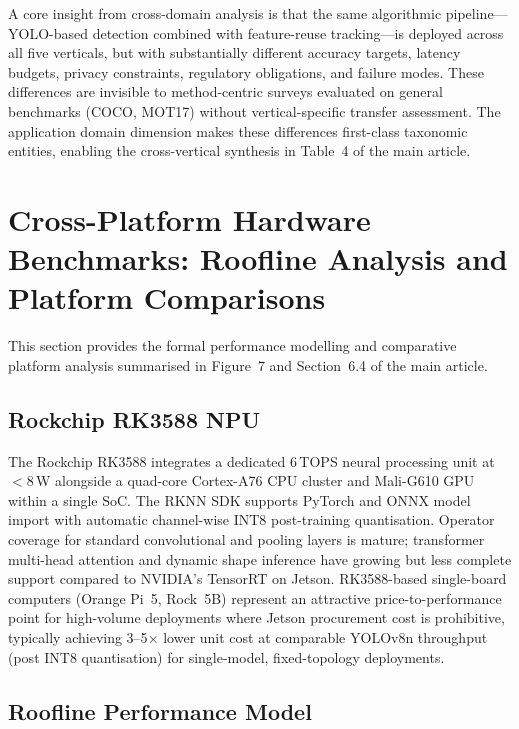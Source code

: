 \documentclass[11pt,a4paper]{article}
\begin{document}
A core insight from cross-domain analysis is that the same
algorithmic pipeline---YOLO-based detection combined with feature-reuse
tracking---is deployed across all five verticals, but with
substantially different accuracy targets, latency budgets, privacy
constraints, regulatory obligations, and failure modes. These
differences are invisible to method-centric surveys evaluated on
general benchmarks (COCO, MOT17) without vertical-specific transfer
assessment. The application domain dimension makes these
differences first-class taxonomic entities, enabling the cross-vertical
synthesis in Table~4 of the main article.

\section{Cross-Platform Hardware Benchmarks: Roofline Analysis
         and Platform Comparisons}
\label{sec:crossplatform}

\noindent This section provides the formal performance modelling and
comparative platform analysis summarised in Figure~7 and Section~6.4
of the main article.

\subsection{Rockchip RK3588 NPU}

The Rockchip RK3588 integrates a dedicated 6\,TOPS neural processing
unit at $<$8\,W alongside a quad-core Cortex-A76 CPU cluster and
Mali-G610 GPU within a single SoC. The RKNN SDK supports PyTorch and
ONNX model import with automatic channel-wise INT8 post-training
quantisation. Operator coverage for standard convolutional and
pooling layers is mature; transformer multi-head attention and dynamic
shape inference have growing but less complete support compared to
NVIDIA's TensorRT on Jetson. RK3588-based single-board computers
(Orange Pi~5, Rock~5B) represent an attractive price-to-performance
point for high-volume deployments where Jetson procurement cost is
prohibitive, typically achieving 3--5$\times$ lower unit cost at
comparable YOLOv8n throughput (post INT8 quantisation) for single-model,
fixed-topology deployments.

\subsection{Roofline Performance Model}
\label{subsec:roofline}
\end{document}
